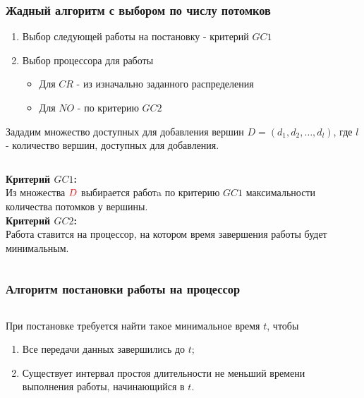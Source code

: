 \begin{frame}
    \frametitle{Жадный алгоритм с выбором по числу потомков}
    \begin{enumerate}
        \item Выбор следующей работы на постановку - критерий $GC1$
        \item Выбор процессора для работы
              \begin{itemize}
                  \item Для $CR$ - из изначально заданного распределения
                  \item Для $NO$ - по критерию $GC2$
              \end{itemize}
    \end{enumerate}
    Зададим множество доступных для добавления вершин $D= \left( d_1, d_2, \dots, d_l \right)$, где $l$ - количество вершин, доступных для добавления.
    \begin{columns}
        \begin{column}{0.6\textwidth}
            \textbf{Критерий $GC1$:} \\
            Из множества $\color{red}D$ выбирается работa по критерию $GC1$ максимальности количества потомков у вершины. \\
            \textbf{Критерий $GC2$:} \\
            Работа ставится на процессор, на котором время завершения работы будет минимальным.

        \end{column}
        \begin{column}{0.4\textwidth}
        \end{column}
    \end{columns}
\end{frame}

\begin{frame}
    \frametitle{Алгоритм постановки работы на процессор}
    \begin{columns}
        \begin{column}{0.55\textwidth}
            При постановке требуется найти такое минимальное время $t$, чтобы
            \begin{enumerate}
                \item Все передачи данных завершились до $t$;
                \item Существует интервал простоя длительности не меньший времени выполнения работы, начинающийся в $t$.
            \end{enumerate}
        \end{column}
        \begin{column}{0.45\textwidth}
            {
                \tiny
            }
            {
                \tiny
            }
        \end{column}
    \end{columns}
\end{frame}

